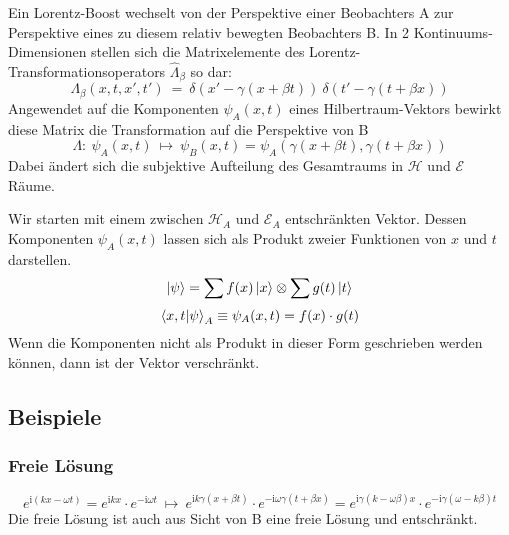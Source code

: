 \documentclass[12pt]{article}
\begin{document}
Ein Lorentz-Boost wechselt von der Perspektive einer Beobachters A zur Perspektive eines zu diesem relativ bewegten Beobachters B. In 2 Kontinuums-Dimensionen stellen sich die Matrixelemente des Lorentz-Transformationsoperators $\hat{\Lambda}_\beta$ so dar:
\begin{equation}
\label{eq:matrix_lorentz}
\Lambda_\beta(x,t,x',t')\ =\ \delta(x'-\gamma(x+\beta t))\ \delta(t'-\gamma(t+\beta x))
\end{equation}
Angewendet auf die Komponenten $\psi_A(x,t)$ eines Hilbertraum-Vektors bewirkt diese Matrix die Transformation auf die Perspektive von B
\begin{equation}
\label{eq:lorentz_scalar}
\Lambda:\ \psi_A(x,t)\ \mapsto\ \psi_B(x,t) = \psi_A(\gamma(x+\beta t),\gamma(t+\beta x))
\end{equation}
Dabei ändert sich die subjektive Aufteilung des Gesamtraums in $\mathscr{H}$ und $\mathscr{E}$ Räume.

Wir starten mit einem zwischen $\mathscr{H}_A$ und $\mathscr{E}_A$ entschränkten Vektor. Dessen Komponenten $\psi_A(x,t)$ lassen sich als Produkt zweier Funktionen von $x$ und $t$ darstellen. 
\begin{equation*}
\ket{\psi} = \sum f(x) \ket{x} \otimes  \sum g(t) \ket{t}
\end{equation*}
\begin{equation*}
\bra{x,t}\ket{\psi}_A \equiv \psi_A(x,t) = f(x) \cdot g(t)
\end{equation*}
Wenn die Komponenten nicht als Produkt in dieser Form geschrieben werden können, dann ist der Vektor verschränkt. 

\subsection{Beispiele}

\subsubsection{Freie Lösung}

\begin{equation*}
e^{\mathrm{i}(kx-\omega t)}
= 
e^{\mathrm{i}kx}\cdot e^{-\mathrm{i}\omega t}
\ \mapsto \ 
e^{\mathrm{i}k\gamma(x+\beta t)} \cdot e^{-\mathrm{i}\omega \gamma(t+\beta x)}
= 
e^{\mathrm{i}\gamma(k-\omega \beta)x} \cdot e^{-\mathrm{i}\gamma(\omega- k \beta)t}
\end{equation*}
Die freie Lösung ist auch aus Sicht von B eine freie Lösung und entschränkt. 
\end{document}
